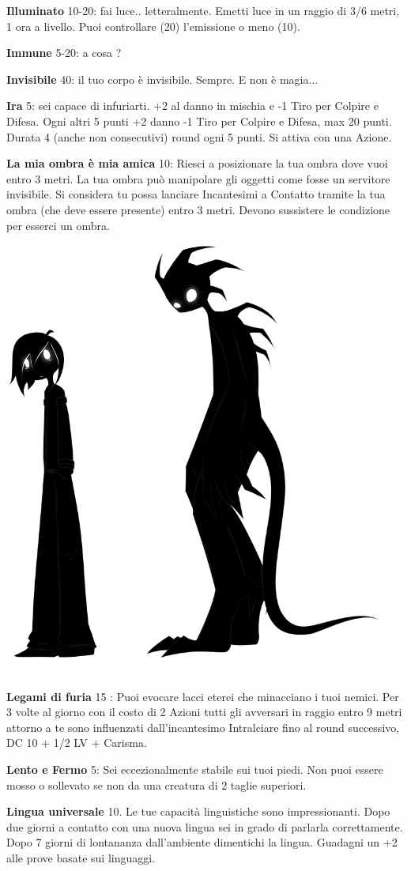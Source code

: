 \documentclass[a4paper,twoside,openany]{book}
\begin{document}
\begin{multicols}{2}
\textbf{Illuminato} 10-20: fai luce.. letteralmente. Emetti luce in un raggio di 3/6 metri, 1 ora a livello. Puoi controllare (20) l'emissione o meno (10).

\textbf{Immune} 5-20: a cosa ?

\textbf{Invisibile} 40: il tuo corpo è invisibile. Sempre. E non è magia...

\textbf{Ira} 5: sei capace di infuriarti. +2 al danno in mischia e -1 Tiro per Colpire e Difesa. Ogni altri 5 punti +2 danno -1 Tiro per Colpire e Difesa, max 20 punti. Durata 4 (anche non consecutivi) round ogni 5 punti. Si attiva con una Azione.

\textbf{La mia ombra è mia amica} 10: Riesci a posizionare la tua ombra dove vuoi entro 3 metri. La tua ombra può manipolare gli oggetti come fosse un servitore invisibile. Si considera tu possa lanciare Incantesimi a Contatto tramite la tua ombra (che deve essere presente) entro 3 metri. Devono sussistere le condizione per esserci un ombra.

\begin{center}
\includegraphics[width=0.35\linewidth]{immagini/shadow.png}
\end{center}

\textbf{Legami di furia} 15 : Puoi evocare lacci eterei che minacciano i tuoi nemici. Per 3 volte al giorno con il costo di 2 Azioni tutti gli avversari in raggio entro 9 metri attorno a te sono influenzati dall'incantesimo Intralciare fino al round successivo, DC 10 + 1/2 LV + Carisma.

\textbf{Lento e Fermo} 5: Sei eccezionalmente stabile sui tuoi piedi. Non puoi essere mosso o sollevato se non da una creatura di 2 taglie superiori.

\textbf{Lingua universale} 10. Le tue capacità linguistiche sono impressionanti. Dopo due giorni a contatto con una nuova lingua sei in grado di parlarla correttamente. Dopo 7 giorni di lontananza dall'ambiente dimentichi la lingua. Guadagni un +2 alle prove basate sui linguaggi.


\end{multicols}
\end{document}
